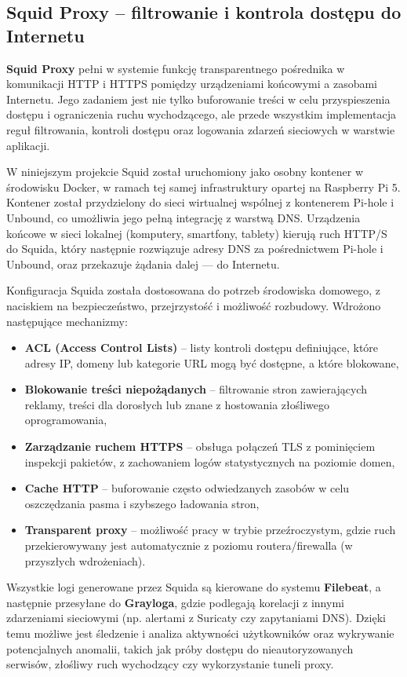 \documentclass[
    left=2.5cm,         %
    right=2.5cm,        %
    top=2.5cm,          %
    bottom=3cm,         %
    bindingoffset=6mm,  %
    nohyphenation=true %
]{eiti/eiti-thesis} %
\begin{document}
\subsection{Squid Proxy – filtrowanie i kontrola dostępu do Internetu}

\textbf{Squid Proxy}\cite{squid-docs} pełni w systemie funkcję transparentnego pośrednika w komunikacji HTTP i HTTPS pomiędzy urządzeniami końcowymi a zasobami Internetu. Jego zadaniem jest nie tylko buforowanie treści w celu przyspieszenia dostępu i ograniczenia ruchu wychodzącego, ale przede wszystkim implementacja reguł filtrowania, kontroli dostępu oraz logowania zdarzeń sieciowych w warstwie aplikacji.

W niniejszym projekcie Squid został uruchomiony jako osobny kontener w środowisku Docker, w ramach tej samej infrastruktury opartej na Raspberry Pi 5. Kontener został przydzielony do sieci wirtualnej wspólnej z kontenerem Pi-hole i Unbound, co umożliwia jego pełną integrację z warstwą DNS. Urządzenia końcowe w sieci lokalnej (komputery, smartfony, tablety) kierują ruch HTTP/S do Squida, który następnie rozwiązuje adresy DNS za pośrednictwem Pi-hole i Unbound, oraz przekazuje żądania dalej — do Internetu.

Konfiguracja Squida została dostosowana do potrzeb środowiska domowego, z naciskiem na bezpieczeństwo, przejrzystość i możliwość rozbudowy. Wdrożono następujące mechanizmy:
\begin{itemize}
    \item \textbf{ACL (Access Control Lists)} – listy kontroli dostępu definiujące, które adresy IP, domeny lub kategorie URL mogą być dostępne, a które blokowane,
    \item \textbf{Blokowanie treści niepożądanych} – filtrowanie stron zawierających reklamy, treści dla dorosłych lub znane z hostowania złośliwego oprogramowania,
    \item \textbf{Zarządzanie ruchem HTTPS} – obsługa połączeń TLS z pominięciem inspekcji pakietów, z zachowaniem logów statystycznych na poziomie domen,
    \item \textbf{Cache HTTP} – buforowanie często odwiedzanych zasobów w celu oszczędzania pasma i szybszego ładowania stron,
    \item \textbf{Transparent proxy} – możliwość pracy w trybie przeźroczystym, gdzie ruch przekierowywany jest automatycznie z poziomu routera/firewalla (w przyszłych wdrożeniach).
\end{itemize}

Wszystkie logi generowane przez Squida są kierowane do systemu \textbf{Filebeat}, a następnie przesyłane do \textbf{Grayloga}, gdzie podlegają korelacji z innymi zdarzeniami sieciowymi (np. alertami z Suricaty czy zapytaniami DNS). Dzięki temu możliwe jest śledzenie i analiza aktywności użytkowników oraz wykrywanie potencjalnych anomalii, takich jak próby dostępu do nieautoryzowanych serwisów, złośliwy ruch wychodzący czy wykorzystanie tuneli proxy.
\end{document}
